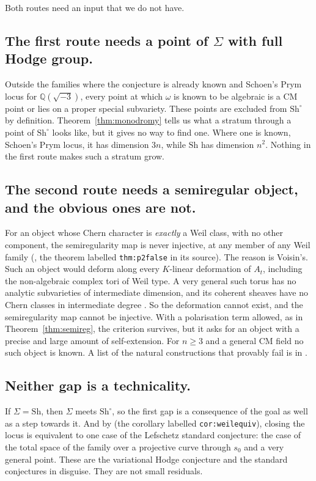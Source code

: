 \documentclass[11pt]{amsart}
\theoremstyle{definition}
\theoremstyle{remark}
\newcommand{\QQ}{\mathbb{Q}}
\newcommand{\Sh}{\mathrm{Sh}}
\begin{document}
Both routes need an input that we do not have.

\subsection*{The first route needs a point of $\Sigma$ with full Hodge group.}
Outside the families where the conjecture is already known and Schoen's
Prym locus for $\QQ(\sqrt{-3})$, every point at which $\omega$ is known to
be algebraic is a CM point or lies on a proper special subvariety. These
points are excluded from $\Sh^{\circ}$ by definition.
Theorem~\ref{thm:monodromy} tells us what a stratum through a point of
$\Sh^{\circ}$ looks like, but it gives no way to find one. Where one is
known, Schoen's Prym locus, it has dimension $3n$, while $\Sh$ has
dimension $n^{2}$. Nothing in the first route makes such a stratum grow.

\subsection*{The second route needs a semiregular object, and the obvious
ones are not.}
For an object whose Chern character is \emph{exactly} a Weil class, with no
other component, the semiregularity map is never injective, at any member
of any Weil family (\cite{BhH8}, the theorem labelled \texttt{thm:p2false}
in its source). The reason is
Voisin's. Such an object would deform along every $K$-linear deformation of
$A_{t}$, including the non-algebraic complex tori of Weil type. A very
general such torus has no analytic subvarieties of intermediate dimension,
and its coherent sheaves have no Chern classes in intermediate degree
\cite{Voi02b}. So the deformation cannot exist, and the semiregularity map
cannot be injective. With a polarisation term allowed, as in
Theorem~\ref{thm:semireg}, the criterion survives, but it asks for an object
with a precise and large amount of self-extension. For $n\ge3$ and a
general CM field no such object is known. A list of the natural
constructions that provably fail is in \cite{BhH8}.

\subsection*{Neither gap is a technicality.}
If $\Sigma=\Sh$, then $\Sigma$ meets $\Sh^{\circ}$, so the first gap is
a consequence of the goal as well as a step towards it. And by
\cite{BhH8} (the corollary labelled \texttt{cor:weilequiv}), closing the
locus is equivalent to one case of the Lefschetz standard conjecture: the
case of the total space of the family over a projective curve through
$s_{0}$ and a very general point. These are the variational Hodge
conjecture and the standard conjectures in disguise. They are not small residuals.
\end{document}
